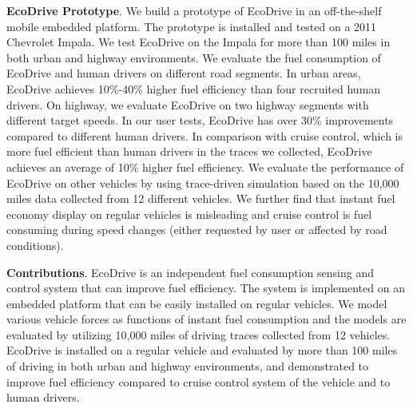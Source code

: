 \textbf{EcoDrive Prototype}. We build a prototype of EcoDrive in an off-the-shelf mobile embedded platform. 
The prototype is installed and tested on a 2011 Chevrolet Impala. 
We test EcoDrive on the Impala for more than 100 miles in both urban and highway environments.
We evaluate the fuel consumption of EcoDrive and human drivers on different road segments.   
In urban areas, EcoDrive achieves 10\%-40\% higher fuel efficiency than four recruited human drivers.
On highway, we evaluate EcoDrive on two highway segments with different target speeds.    
In our user tests, EcoDrive has over 30\% improvements compared to different human drivers. 
In comparison with cruise control, which is more fuel efficient
than human drivers in the traces we collected, 
EcoDrive achieves an average of 10\% higher fuel efficiency.  
We evaluate the performance of EcoDrive on other vehicles by using trace-driven simulation
based on the 10,000 miles data collected from 12 different vehicles. 
We further find that instant
fuel economy display on regular vehicles is misleading and cruise
control is fuel consuming during speed changes (either requested
by user or affected by road conditions).  



\textbf{Contributions}. 
EcoDrive is an independent fuel consumption sensing and control system
that can improve fuel efficiency. 
The system is implemented on an embedded platform 
that can be easily installed on regular vehicles. 
We model various vehicle forces as functions of instant fuel consumption
and the models are evaluated by utilizing 
10,000 miles of driving traces collected from 12 vehicles. 
EcoDrive is installed on a regular vehicle and evaluated by more than 100 miles of driving in both urban and highway environments, 
and demonstrated to improve fuel efficiency compared to cruise control system
of the vehicle and to human drivers.  



